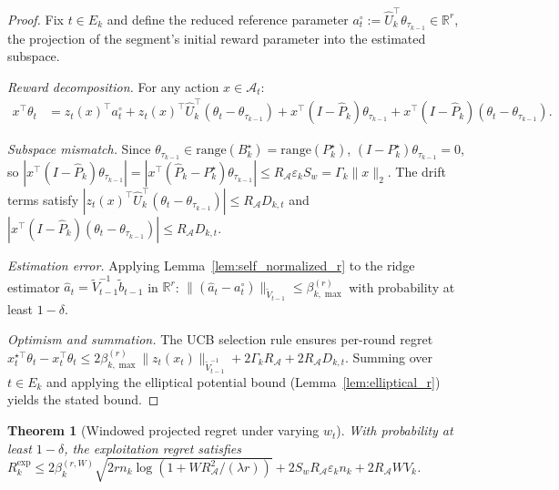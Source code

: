 \documentclass[11pt]{article}
\newcommand{\R}{\mathbb{R}}
\newcommand{\cA}{\mathcal{A}}
\newcommand{\range}{\mathrm{range}}
\newtheorem{theorem}{Theorem}
\begin{document}
\begin{proof}
Fix $t \in E_k$ and define the reduced reference parameter
$a_t^\circ := \widehat U_k^\top \theta_{\tau_{k-1}} \in \R^r$, the projection of
the segment's initial reward parameter into the estimated subspace.

\emph{Reward decomposition.}
For any action $x \in \cA_t$:
\begin{align*}
x^\top \theta_t
&= z_t(x)^\top a_t^\circ + z_t(x)^\top \widehat U_k^\top (\theta_t - \theta_{\tau_{k-1}}) + x^\top(I - \widehat P_k)\theta_{\tau_{k-1}} + x^\top(I-\widehat P_k)(\theta_t - \theta_{\tau_{k-1}}).
\end{align*}

\emph{Subspace mismatch.}
Since $\theta_{\tau_{k-1}} \in \range(B_k^\star) = \range(P_k^\star)$,
$(I - P_k^\star)\theta_{\tau_{k-1}} = 0$, so
$|x^\top(I - \widehat P_k)\theta_{\tau_{k-1}}|
= |x^\top(\widehat P_k - P_k^\star)\theta_{\tau_{k-1}}|
\le R_{\cA}\varepsilon_k S_w = \Gamma_k\|x\|_2$.
The drift terms satisfy
$|z_t(x)^\top \widehat U_k^\top(\theta_t - \theta_{\tau_{k-1}})| \le R_{\cA} D_{k,t}$
and $|x^\top(I-\widehat P_k)(\theta_t - \theta_{\tau_{k-1}})| \le R_{\cA} D_{k,t}$.

\emph{Estimation error.}
Applying Lemma~\ref{lem:self_normalized_r} to the ridge estimator
$\widehat a_t = \widetilde V_{t-1}^{-1} \widetilde b_{t-1}$ in $\R^r$:
$\|(\widehat a_t - a_t^\circ)\|_{\widetilde V_{t-1}} \le \beta_{k,\max}^{(r)}$
with probability at least $1-\delta$.

\emph{Optimism and summation.}
The UCB selection rule ensures per-round regret
$x_t^{\star\top}\theta_t - x_t^\top\theta_t
\le 2\beta_{k,\max}^{(r)}\|z_t(x_t)\|_{\widetilde V_{t-1}^{-1}} + 2\Gamma_k R_{\cA} + 2R_{\cA} D_{k,t}$.
Summing over $t \in E_k$ and applying the elliptical potential bound
(Lemma~\ref{lem:elliptical_r}) yields the stated bound.
\end{proof}

\begin{theorem}[Windowed projected regret under varying $w_t$]
\label{thm:windowed_projected_varying}
With probability at least $1-\delta$, the exploitation regret satisfies
$R_k^{\mathrm{exp}} \le 2\beta_k^{(r,W)} \sqrt{2rn_k\log(1+WR_{\cA}^2/(\lambda r))} + 2S_wR_{\cA}\varepsilon_k n_k + 2R_{\cA} W V_k$.
\end{theorem}
\end{document}

